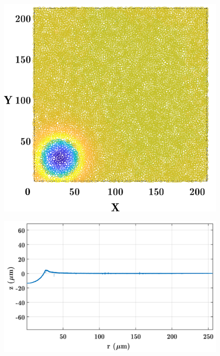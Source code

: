 \begin{figure}
	\centering
	\includegraphics[width=\linewidth]{Chapters/Figures/sphere011_ia/particle_located_top_view}
	\caption[Particle Located: Top View]{}
	\label{fig:particlelocatedtopview}
\end{figure}
\begin{figure}
	\centering
	\includegraphics[width=\linewidth]{Chapters/Figures/sphere011_ia/side_collapsed}
	\caption[Collapsed Side Profile]{}
	\label{fig:sidecollapsed}
\end{figure}
